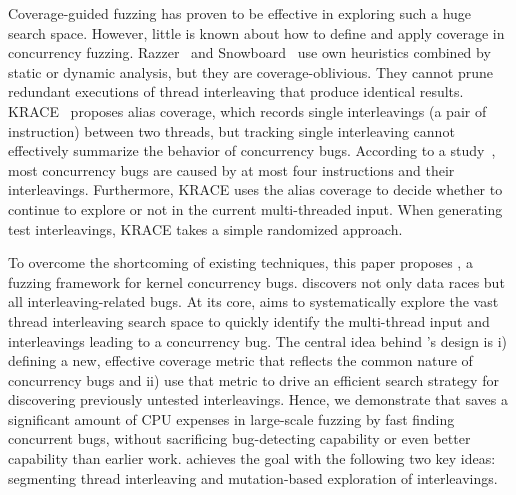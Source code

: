 

Coverage-guided fuzzing has proven to be effective in exploring such a huge search space.
However, little is known about how to define and apply coverage in concurrency fuzzing.
Razzer~\cite{razzer} and Snowboard~\cite{snowboard} use own heuristics
combined by static or dynamic analysis, but they are coverage-oblivious.
They cannot prune redundant executions of thread interleaving
that produce identical results. 
KRACE~\cite{krace} proposes alias coverage, which records 
single interleavings (a pair of instruction) between two threads, but tracking 
single interleaving cannot effectively summarize the behavior 
of concurrency bugs. According to a study~\cite{learningfrommistakes}, 
most concurrency bugs are caused by at most four instructions and their
interleavings. Furthermore, KRACE uses 
the alias coverage to decide whether to continue to explore or not 
in the current multi-threaded input. When generating test interleavings,
KRACE takes a simple randomized approach.

To overcome the shortcoming of existing techniques, this paper proposes
\sys, a fuzzing framework for kernel concurrency bugs. 
\sys discovers not only data races but 
all interleaving-related bugs. 
At its core, \sys aims to systematically explore the vast thread
interleaving search space to quickly identify the multi-thread input and 
interleavings leading to a concurrency bug. The central idea behind \sys's design
is i) defining a new, effective coverage metric that reflects the 
common nature of concurrency bugs and ii) use that metric to drive 
an efficient search strategy for discovering previously untested interleavings.
Hence, we demonstrate that \sys saves a significant amount of CPU expenses 
in large-scale fuzzing by fast finding concurrent bugs, 
without sacrificing bug-detecting capability or even better 
capability than earlier work.
\sys achieves the goal with the following two key ideas:
segmenting thread interleaving and mutation-based exploration of interleavings.

